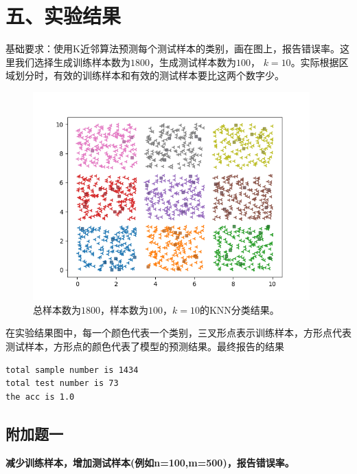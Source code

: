 \documentclass{article}
\begin{document}
\section*{\LARGE 五、实验结果}
基础要求：使用K近邻算法预测每个测试样本的类别，画在图上，报告错误率。这里我们选择生成训练样本数为$1800$，生成测试样本数为$100$，
$k=10$。实际根据区域划分时，有效的训练样本和有效的测试样本要比这两个数字少。
\begin{figure}[H]
    \centering
    \begin{minipage}[t]{1.0\linewidth}
        \centering
        \includegraphics[height=8cm]{Figure_1.png}
        \caption{总样本数为$1800$，样本数为$100$，$k=10$的KNN分类结果。}
    \end{minipage}
 \end{figure}
在实验结果图中，每一个颜色代表一个类别，三叉形点表示训练样本，方形点代表测试样本，方形点的颜色代表了模型的预测结果。最终报告的结果
\begin{verbatim}
total sample number is 1434
total test number is 73
the acc is 1.0
\end{verbatim}


\subsection*{\Large 附加题一}
{\large\textbf{减少训练样本，增加测试样本(例如n=100,m=500)，报告错误率。}}
\end{document}
